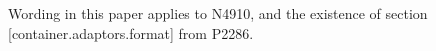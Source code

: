 
% 

Wording in this paper applies to N4910, and the existence of section
[container.adaptors.format] from P2286.

\markboth{\contentsname}{}

\makeatletter
\renewcommand\@pnumwidth{2.5em}
\makeatother

\tableofcontents
\setcounter{tocdepth}{5}

%
